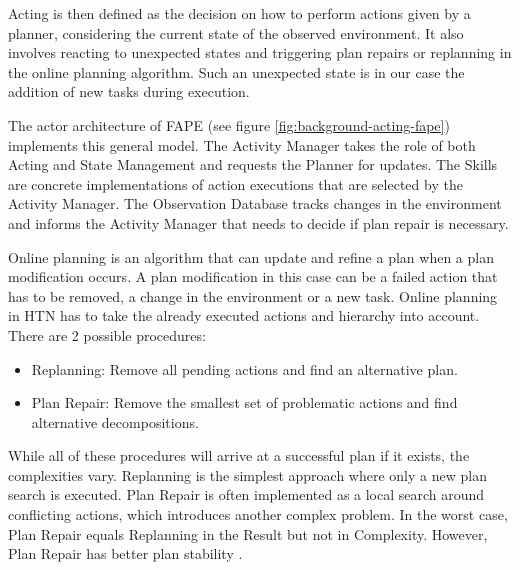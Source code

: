 Acting is then defined as the decision on how to perform actions given by a planner, considering the current state of the observed environment.
It also involves reacting to unexpected states and triggering plan repairs or replanning in the online planning algorithm.
Such an unexpected state is in our case the addition of new tasks during execution.

The actor architecture of FAPE (see figure \ref{fig:background-acting-fape}) implements this general model.
The Activity Manager takes the role of both Acting and State Management and requests the Planner for updates.
The Skills are concrete implementations of action executions that are selected by the Activity Manager.
The Observation Database tracks changes in the environment and informs the Activity Manager that needs to decide if plan repair is necessary.





Online planning is an algorithm that can update and refine a plan when a plan modification occurs.
A plan modification in this case can be a failed action that has to be removed, a change in the environment or a new task.
Online planning in HTN has to take the already executed actions and hierarchy into account.
There are 2 possible procedures:
\begin{itemize}
  \item Replanning: Remove all pending actions and find an alternative plan.
  \item Plan Repair: Remove the smallest set of problematic actions and find alternative decompositions.
\end{itemize}

While all of these procedures will arrive at a successful plan if it exists, the complexities vary.
Replanning is the simplest approach where only a new plan search is executed.
Plan Repair is often implemented as a local search around conflicting actions, which introduces another complex problem.
In the worst case, Plan Repair equals Replanning in the Result but not in Complexity.
However, Plan Repair has better plan stability \citep{foxPlanStabilityReplanning2006}.


